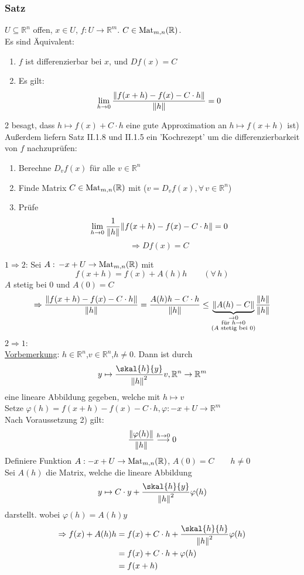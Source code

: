 \subsubsection{Satz} %
\label{ssub:satz}
$U \subseteq \mathbb{R}^n$ offen, $x \in U$, $f:U \to \mathbb{R}^m$. $C \in \operatorname{Mat}_{m,n}(\mathbb{R})$.\\ Es sind Äquivalent:
\begin{enumerate}
	\item $f$ ist differenzierbar bei $x$, und $Df(x)=C$
	\item Es gilt:
	\[
		\lim_{h \to 0} \frac{\norm{f(x+h)-f(x)-C \cdot h}}{\norm{h}} = 0
	\]
\end{enumerate}
2 besagt, dass $h \mapsto f(x)+C \cdot h$ eine gute Approximation an $h \mapsto f(x+h)$ ist) \\
Außerdem liefern Satz II.1.8 und II.1.5 ein 'Kochrezept' um die differenzierbarkeit von $f$ nachzuprüfen:
 \begin{enumerate}
 	\item Berechne $D_{v}f(x)$ für alle $v \in \mathbb{R}^n$
	\item Finde Matrix $C \in \operatorname{Mat}_{m,n}(\mathbb{R})$ mit ($v=D_vf(x),\forall\, v \in \mathbb{R}^n$)
	\item Prüfe \[
		\lim_{h \to 0} \frac{1}{\norm{h}}\norm{f(x+h)-f(x)-C \cdot h}=0
	\]
	\[
		\Rightarrow Df(x)=C
	\]
 \end{enumerate}
 
 \underline{$1 \Rightarrow 2$}: Sei $A: \,-x+U \to \operatorname{Mat}_{m,n}(\mathbb{R})$ mit
 \[
 	f(x+h)=f(x)+A(h)h \qquad (\forall\, h)
 \]
 $A$ stetig bei $0$ und $A(0)=C$
 \[
 	\Rightarrow \frac{\norm{f(x+h)-f(x)-C \cdot h}}{\norm{h}}= \frac{A(h)h-C \cdot h}{\norm{h}} \leq \underset{\substack{\to 0 \\ \text{für }h \to 0 \\ \text{($A$ stetig bei }0)}}{\underbrace{\norm{A(h)-C}}} \frac{\norm{h}}{\norm{h}}
 \]
\underline{$2 \Rightarrow 1$}: \\
\underline{Vorbemerkung}: $h \in \mathbb{R}^n$,$v \in \mathbb{R}^n$,$h \neq 0$. Dann ist durch 
\[
	y \mapsto \frac{\skal{h}{y}}{\norm{h}^2}v , \mathbb{R}^n \to \mathbb{R}^m 
\]
eine lineare Abbildung gegeben, welche mit $h \mapsto v$ \\
Setze $\varphi (h) = f(x+h)-f(x)-C \cdot h , \varphi: -x+U \to \mathbb{R}^m$ \\
Nach Voraussetzung 2) gilt:
\[
	\frac{\norm{\varphi(h)}}{\norm{h}} \stackrel{h \to 0}{\longrightarrow} 0 
\]
Definiere Funktion $A: -x+U \to \operatorname{Mat}_{m,n}(\mathbb{R})$, $A(0)=C \qquad h \neq 0$\\
Sei $A(h)$ die Matrix, welche die lineare Abbildung \[
	y \mapsto C \cdot y + \frac{\skal{h}{y}}{\norm{h}^2}\varphi(h)
\]
darstellt. wobei $\varphi(h)=A(h)y$
\begin{align*}
	\Rightarrow f(x)+A(h)h &= f(x)+C \cdot h + \frac{\skal{h}{h}}{\norm{h}^2}\varphi(h) \\
	&=f(x)+C \cdot h + \varphi(h) \\
	&=f(x+h)	\\
\end{align*}

